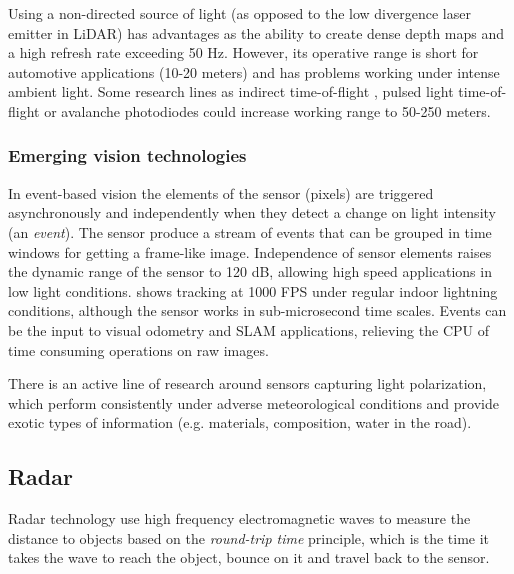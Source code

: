 Using a non-directed source of light (as opposed to the low divergence laser
emitter in LiDAR) has advantages as the ability to create dense depth maps and
a high refresh rate exceeding 50 Hz. However, its operative range is short for
automotive applications (10-20 meters) and has problems working under intense
ambient light. 
Some research lines as indirect time-of-flight \cite{Villa2017}, pulsed light
time-of-flight or avalanche photodiodes \cite{Panasonic2018} could increase
working range to 50-250 meters.
    


\subsubsection{Emerging vision technologies}

In event-based vision the elements of the sensor (pixels) are triggered 
asynchronously and independently when they detect a change on light intensity 
(an \emph{event}).
The sensor produce a stream of events that can be grouped in time windows for
getting a frame-like image. 
Independence of sensor elements raises the dynamic range of the sensor to 
120 dB, allowing high speed applications in low light conditions. 
\cite{Mueggler2014} shows tracking at 1000 FPS under regular indoor lightning 
conditions, although the sensor works in sub-microsecond time scales.
Events can be the input to visual odometry \cite{Censi2014} and SLAM
\cite{Vidal2017} applications, relieving the CPU of time consuming operations
on raw images. 

There is an active line of research \cite{Garcia2018} around sensors 
capturing light polarization, which perform consistently under adverse
meteorological conditions and provide exotic types of information (e.g.
materials, composition, water in the road).
 

\subsection{Radar}

Radar technology use high frequency electromagnetic waves to measure the
distance to objects based on the \emph{round-trip time} principle, which is the
time it takes the wave to reach the object, bounce on it and travel back to the
sensor. 
 
